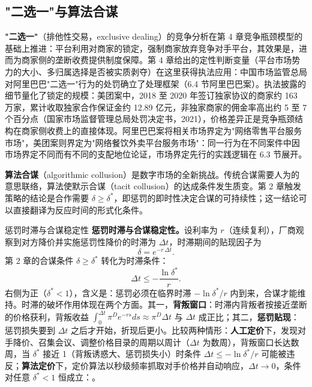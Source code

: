 \subsection{"二选一"与算法合谋}

\textbf{"二选一"}（排他性交易，exclusive dealing）的竞争分析在第 4 章竞争瓶颈模型的基础上推进：平台利用对商家的锁定，强制商家放弃竞争对手平台，其效果是，进而为商家侧的垄断收费提供制度保障。第 4 章给出的定性判断变量（平台市场势力的大小、多归属选择是否被实质剥夺）在这里获得执法应用：中国市场监管总局对阿里巴巴"二选一"行为的处罚确立了处理框架（6.4 节阿里巴巴案）。执法披露的细节量化了锁定的规模：美团案中，2018 至 2020 年签订独家协议的商家约 163 万家，累计收取独家合作保证金约 12.89 亿元，非独家商家的佣金率高出约 5 至 7 个百分点（国家市场监督管理总局处罚决定书，2021），价格差异正是竞争瓶颈结构在商家侧收费上的直接体现。阿里巴巴案将相关市场界定为"网络零售平台服务市场"，美团案则界定为"网络餐饮外卖平台服务市场"：同一行为在不同案件中因市场界定不同而有不同的支配地位论证，市场界定先行的实践逻辑在 6.3 节展开。

\textbf{算法合谋}（algorithmic collusion）是数字市场的全新挑战。传统合谋需要人为的意思联络，算法使默示合谋（tacit collusion）的达成条件发生质变。第 2 章触发策略的结论是合作需要 $\delta \geq \delta^*$，即惩罚的即时性决定合谋的可持续性；这一结论可以直接翻译为反应时间的形式化条件。

\begin{derivation}{惩罚时滞与合谋稳定性}{}
\textbf{惩罚时滞与合谋稳定性。}设利率为 $r$（连续复利），厂商观察到对方降价并实施惩罚性降价的时滞为 $\Delta t$，时滞期间的贴现因子为
\[
\delta = e^{-r\,\Delta t}.
\]
第 2 章的合谋条件 $\delta \geq \delta^*$ 转化为时滞条件：
\[
\Delta t \leq -\frac{\ln \delta^*}{r}.
\]
右侧为正（$\delta^* < 1$），含义是：惩罚必须在临界时滞 $-\ln \delta^*/r$ 内到来，合谋才能维持。时滞的破坏作用体现在两个方面。其一，\textbf{背叛窗口}：时滞内背叛者按接近垄断的价格获利，背叛收益 $\int_0^{\Delta t} \pi^D e^{-rs} ds \approx \pi^D \Delta t$ 与 $\Delta t$ 成正比；其二，\textbf{惩罚贴现}：惩罚损失要到 $\Delta t$ 之后才开始，折现后更小。比较两种情形：\textbf{人工定价}下，发现对手降价、召集会议、调整价格目录的周期以周计（$\Delta t$ 为数周），背叛窗口长达数周，当 $\delta^*$ 接近 1（背叛诱惑大、惩罚损失小）时条件 $\Delta t \leq -\ln \delta^*/r$ 可能被违反；\textbf{算法定价}下，定价算法以秒级频率抓取对手价格并自动响应，$\Delta t \to 0$，条件对任意 $\delta^* < 1$ 恒成立：。
\end{derivation}

